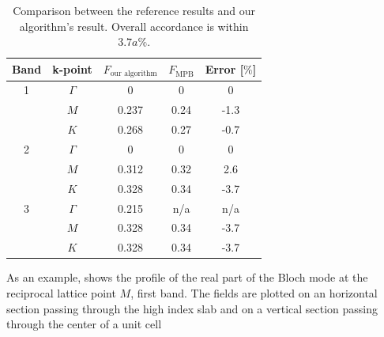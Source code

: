 \begin{table}[htbp]
  \begin{center}
    \begin{tabular}{|*{5}{c|}}
      \hline
      Band & k-point & $F_{\text{our algorithm}}$ & $F_{\text{MPB}}$ & Error [$\%$] \\
      \hline
      1 & $\Gamma$ & 0 & 0 & 0 \\
        & $M$ & 0.237 & 0.24 & -1.3 \\
        & $K$ & 0.268 & 0.27 & -0.7 \\
      2 & $\Gamma$ & 0 & 0 & 0 \\
        & $M$ & 0.312 & 0.32 & 2.6 \\
        & $K$ & 0.328 & 0.34 & -3.7 \\
      3 & $\Gamma$ & 0.215 & n/a & n/a \\
        & $M$ & 0.328 & 0.34 & -3.7 \\
        & $K$ & 0.328 & 0.34 & -3.7 \\
      \hline
    \end{tabular}
  \end{center}
  \caption{Comparison between the reference results and our
  algorithm's result. Overall accordance is within $3.7a\%$.}
  \label{tab:test_4}
\end{table}

As an example,  shows the profile of the real
part of the Bloch mode at the reciprocal lattice point $M$, first
band. The fields are plotted on an horizontal section passing through
the high index slab and on a vertical section passing through the
center of a unit cell

